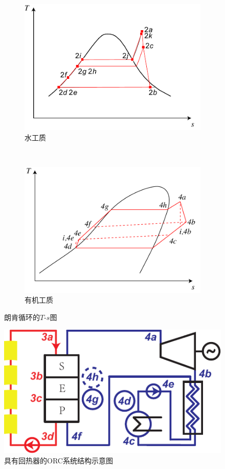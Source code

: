 \noindent \begin{figure}[htbp]
\centering
	\begin{subfigure}[b]{0.35\columnwidth}
	\includegraphics[width = \columnwidth]{fig/Ts_a.pdf}
	\caption{水工质}\label{fig:Ts_Water}
	\end{subfigure}
	~
\begin{subfigure}[b]{0.35\columnwidth}
	\includegraphics[width = \columnwidth]{fig/Ts_b.pdf}
	\caption{有机工质}\label{fig:Ts_organic}
	\end{subfigure}
	
	\caption{朗肯循环的$T$-$s$图}\label{fig:Ts}
\end{figure}

\noindent \begin{figure}[htbp]
\begin{center}
	\includegraphics[width = 0.4\columnwidth]{fig/ORCsystem2.pdf}
	\caption{具有回热器的ORC系统结构示意图}
	\label{fig:ORCsystem2}
\end{center}
\end{figure}

